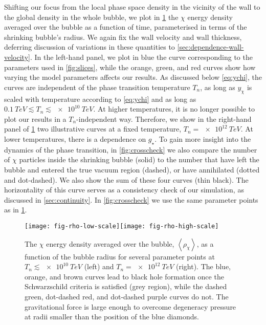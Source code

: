 \documentclass[
onecolumn, %
11pt, %
tightenlines,
superscriptaddress, %
nofootinbib, %
preprintnumbers, %
prd %
]{revtex4-1}
\newcommand{\ev}[1]{\ensuremath{\left\langle #1 %
        \right\rangle}} %
\begin{document}
Shifting our focus from the local phase space density in the vicinity of the wall to the global density in the whole bubble, we plot in \cref{fig:rho} the $\chi$ energy density averaged over the bubble as a function of time, parameterised in terms of the shrinking bubble's radius.  We again fix the wall velocity and wall thickness, deferring discussion of variations in these quantities to \cref{sec:dependence-wall-velocity}. In the left-hand panel, we plot in blue the curve corresponding to the parameters used in \cref{fig:slices}, while the orange, green, and red curves show how varying the model parameters affects our results. As discussed below \cref{eq:ychi}, the curves are independent of the phase transition temperature $T_n$, as long as $y_\chi$ is scaled with temperature according to \cref{eq:ychi} and as long as $\SI{0.1}{TeV} \lesssim T_n \lesssim \SI{e10}{TeV}$. At higher temperatures, it is no longer possible to plot our results in a $T_n$-independent way.  Therefore, we show in the right-hand panel of \cref{fig:rho} two illustrative curves at a fixed temperature, $T_n = \SI{e12}{TeV}$. At lower temperatures, there is a dependence on $g_\star$.  To gain more insight into the dynamics of the phase transition, in \cref{fig:crosscheck} we also compare the number of $\chi$ particles inside the shrinking bubble (solid) to the number that have left the bubble and entered the true vacuum region (dashed), or have annihilated (dotted and dot-dashed). We also show the sum of these four curves (thin black).  The horizontality of this curve serves as a consistency check of our simulation, as discussed in \cref{sec:continuity}.  In \cref{fig:crosscheck} we use the same parameter points as in \cref{fig:rho}.

\begin{figure}
    \centering
    \texttt{[image: fig-rho-low-scale]}\hfill\texttt{[image: fig-rho-high-scale]}
    \caption{
        The $\chi$ energy density averaged over the bubble, $\ev{\rho_\chi}$, as a function of the bubble radius for several parameter points at $T_n\lesssim \SI{e10}{TeV}$ (left) and $T_n = \SI{e12}{TeV}$ (right).  The blue, orange, and brown curves lead to black hole formation once the Schwarzschild criteria is satisfied (grey region), while the dashed green, dot-dashed red, and dot-dashed purple curves do not.  The gravitational force is large enough to overcome degeneracy pressure at radii smaller than the position of the blue diamonds.
    }
    \label{fig:rho}
\end{figure}
\end{document}
